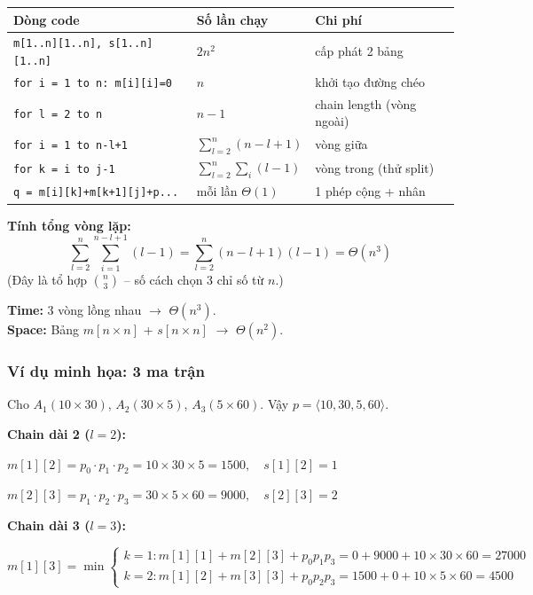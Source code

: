 \documentclass[10pt]{article}
\begin{document}
\begin{tcolorbox}[colback=yellow!5, colframe=orange!50, boxrule=0.5pt, arc=2pt, title={\small\textbf{Phân tích Complexity -- Matrix Chain Multiplication}}]
\begin{tabular}{|l|l|l|}
\hline
\textbf{Dòng code} & \textbf{Số lần chạy} & \textbf{Chi phí} \\
\hline
\texttt{m[1..n][1..n], s[1..n][1..n]} & $2n^2$ & cấp phát 2 bảng \\
\hline
\texttt{for i = 1 to n: m[i][i]=0} & $n$ & khởi tạo đường chéo \\
\hline
\texttt{for l = 2 to n} & $n-1$ & chain length (vòng ngoài) \\
\hline
\quad \texttt{for i = 1 to n-l+1} & $\sum_{l=2}^{n}(n-l+1)$ & vòng giữa \\
\hline
\quad\quad \texttt{for k = i to j-1} & $\sum_{l=2}^{n}\sum_{i}(l-1)$ & vòng trong (thử split) \\
\hline
\quad\quad\quad \texttt{q = m[i][k]+m[k+1][j]+p...} & mỗi lần $\Theta(1)$ & 1 phép cộng + nhân \\
\hline
\end{tabular}
\vspace{0.2cm}

\textbf{Tính tổng vòng lặp:}
\[\sum_{l=2}^{n}\sum_{i=1}^{n-l+1}(l-1) = \sum_{l=2}^{n}(n-l+1)(l-1) = \Theta(n^3)\]
{\small (Đây là tổ hợp $\binom{n}{3}$ -- số cách chọn 3 chỉ số từ $n$.)}

\textbf{Time:} 3 vòng lồng nhau $\to$ $\Theta(n^3)$.\\
\textbf{Space:} Bảng $m[n \times n]$ + $s[n \times n]$ $\to$ $\Theta(n^2)$.
\end{tcolorbox}

\subsubsection{Ví dụ minh họa: 3 ma trận}\label{vd-mcm-3matrix}

Cho $A_1(10 \times 30)$, $A_2(30 \times 5)$, $A_3(5 \times 60)$. Vậy $p = \langle 10, 30, 5, 60 \rangle$.

\textbf{Chain dài 2 ($l = 2$):}

$m[1][2] = p_0 \cdot p_1 \cdot p_2 = 10 \times 30 \times 5 = 1500, \quad s[1][2] = 1$

$m[2][3] = p_1 \cdot p_2 \cdot p_3 = 30 \times 5 \times 60 = 9000, \quad s[2][3] = 2$

\textbf{Chain dài 3 ($l = 3$):}

$m[1][3] = \min\begin{cases} k{=}1: m[1][1] + m[2][3] + p_0 p_1 p_3 = 0 + 9000 + 10 \times 30 \times 60 = 27000 \\ k{=}2: m[1][2] + m[3][3] + p_0 p_2 p_3 = 1500 + 0 + 10 \times 5 \times 60 = 4500 \end{cases}$
\end{document}
